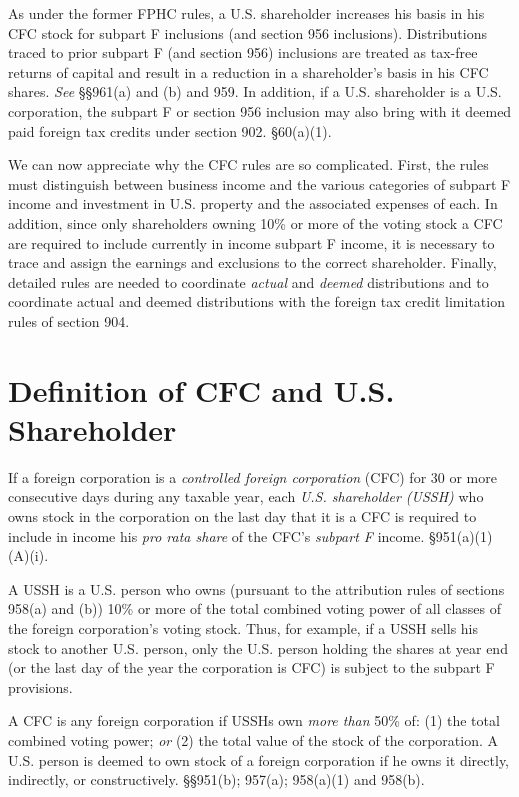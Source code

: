 As under the former FPHC rules, a  U.S. shareholder increases his basis in his CFC stock for subpart F inclusions (and section 956 inclusions).   Distributions traced to prior subpart F (and section 956) inclusions are treated as tax-free returns of capital and result in a reduction in a shareholder's basis in his CFC shares.  \emph{See} \S\S 961(a) and (b) and 959.  In addition, if a U.S. shareholder is a U.S. corporation, the subpart F or section 956 inclusion may also bring with it deemed paid foreign tax credits under section 902.  \S60(a)(1).

We can now appreciate why the CFC rules are so complicated.  First, the rules must distinguish between business income and the various categories of subpart F income and investment in U.S. property and the associated expenses of each.  In addition, since only shareholders owning 10\% or more of the voting stock a CFC are required to include currently in income subpart F income, it is necessary to trace and assign the earnings and exclusions to the correct shareholder.  Finally, detailed rules are needed to coordinate \emph{actual} and \emph{deemed} distributions and to coordinate actual and deemed distributions with the foreign tax credit limitation rules of section 904.
  
	
	\section {Definition of CFC and U.S. Shareholder}
	
		If a foreign corporation is a \emph{controlled foreign corporation} (CFC) for 30 or more consecutive days during any taxable year, each \emph{U.S. shareholder (USSH)} who owns stock in the corporation on the last day that it is a CFC is required to include in income his \emph{pro rata share} of the CFC's \emph{subpart F} income.  \S951(a)(1)(A)(i).  
		
		A USSH is a U.S. person who owns (pursuant to the attribution rules of sections 958(a) and (b)) 10\% or more of the total combined voting power of all classes of the foreign corporation's  voting stock.  Thus, for example, if a USSH sells his stock to another U.S. person, only the U.S. person holding the shares at year end (or the last day of the year the corporation is CFC) is subject to the subpart F provisions.  
		
		A CFC is any foreign corporation if USSHs own \emph{more than} 50\% of: (1) the total combined voting power; \emph{or} (2) the total value of the stock of the corporation.  A U.S. person is deemed to own stock of a foreign corporation if he owns it directly, indirectly, or constructively.  \S\S951(b); 957(a); 958(a)(1) and 958(b).  
		
